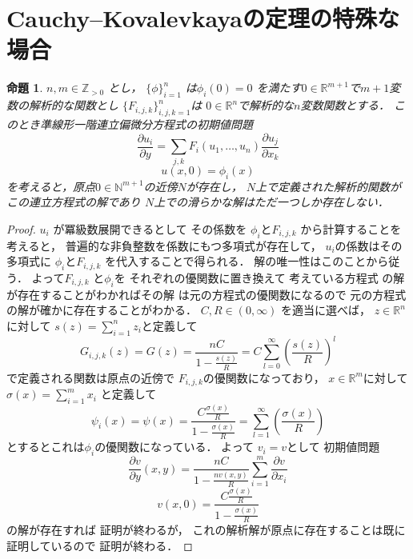 \documentclass[leqno, a4paper, 12pt]{jsarticle}
\newtheorem{prop}[thm]{命題}
\newcommand{\nn}{\mathbb{N}}
\newcommand{\zz}{\mathbb{Z}}
\newcommand{\rr}{\mathbb{R}}
\begin{document}
\section{Cauchy--Kovalevkayaの定理の特殊な場合}
\begin{prop}
$n, m\in \zz_{>0}$
とし，
$\{\phi\}_{i=1}^n$
は$\phi_i(0)=0$
を満たす$0\in \rr^{m+1}$で$m+1$変数の解析的な関数とし
$\{F_{i, j, k}\}_{i, j, k=1}^n$は
$0\in \rr^n$で解析的な$n$変数関数とする．
このとき準線形一階連立偏微分方程式の初期値問題
\[
\frac{\partial u_i}{\partial y}=\sum_{j, k}F_i(u_1, \dots, u_n)\frac{\partial u_j}{\partial x_k}
\]
\[
u(x, 0)=\phi_i(x)
\]
を考えると，原点$0\in \nn^{m+1}$の近傍$N$が存在し，
$N$上で定義された解析的関数がこの連立方程式の解であり
$N$上での滑らかな解はただ一つしか存在しない．
\end{prop}
\begin{proof}
$u_i$
が冪級数展開できるとして
その係数を
$\phi_i$と$F_{i, j, k}$
から計算することを考えると，
普遍的な非負整数を係数にもつ多項式が存在して，
$u_i$の係数はその多項式に
$\phi_i$と$F_{i, j, k}$
を代入することで得られる．
解の唯一性はこのことから従う．
よって$F_{i, j, k}$
と$\phi_i$を
それぞれの優関数に置き換えて
考えている方程式
の解が存在することがわかればその解
は元の方程式の優関数になるので
元の方程式の解が確かに存在することがわかる．
$C, R\in (0, \infty)$
を適当に選べば，
$z\in \rr^{n}$に対して
$s(z)=\sum_{i=1}^nz_i$と定義して
\[
G_{i, j, k}(z)=G(z)=\frac{nC}{1-\frac{s(z)}{R}}=C\sum_{l=0}^{\infty}\left(\frac{s(z)}{R}\right)^l
\]
で定義される関数は原点の近傍で
$F_{i, j, k}$の優関数になっており，
$x\in \rr^{m}$に対して
$\sigma(x)=\sum_{i=1}^mx_i$
と定義して
\[
\psi_i(x)=\psi(x)=\frac{C\frac{\sigma(x)}{R}}{1-\frac{\sigma(x)}{R}}
=\sum_{l=1}^{\infty}\left(\frac{\sigma(x)}{R}\right)
\]
とするとこれは$\phi_i$の優関数になっている．
よって
$v_i=v$として
初期値問題
\begin{equation}\label{eq:44}
\frac{\partial v}{\partial y}(x, y)=\frac{nC}{1-\frac{nv(x, y)}{R}}
\sum_{i=1}^m\frac{\partial v}{\partial x_i}
\end{equation}
\[
v(x, 0)=\frac{C\frac{\sigma(x)}{R}}{1-\frac{\sigma(x)}{R}}
\]
の解が存在すれば
証明が終わるが，
これの解析解が原点に存在することは既に証明しているので
証明が終わる．

\end{proof}
\end{document}

